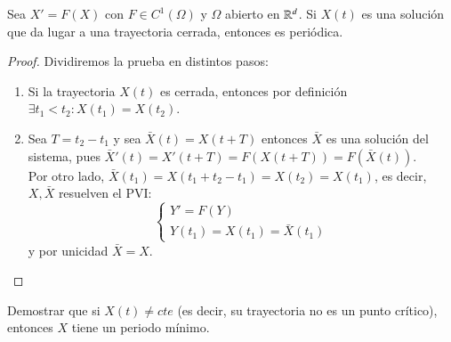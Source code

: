 \begin{pro}
Sea $X'=F(X)$ con $F\in C^1(\Omega)$ y $\Omega$ abierto en $\mathbb{R}^d$. Si $X(t)$ es una solución que da lugar a una trayectoria cerrada, entonces es periódica.
\end{pro}
\begin{proof}
    Dividiremos la prueba en distintos pasos:
    \begin{enumerate}
        \item Si la trayectoria $X(t)$ es cerrada, entonces por definición $\exists t_1 < t_2 : X(t_1) = X(t_2)$.
        \item Sea $T = t_2 - t_1$ y sea $\bar{X}(t) = X(t+T)$ entonces $\bar{X}$ es una solución del sistema, pues $\bar{X}'(t) = X'(t + T) = F(X(t + T)) = F(\bar{X}(t))$.\\
        Por otro lado, $\bar{X}(t_1) = X(t_1 + t_2 - t_1) = X(t_2) = X(t_1)$, es decir, $X, \bar{X}$ resuelven el PVI:
        $$
        \begin{cases}
            Y' = F(Y)\\
            Y(t_1) = X(t_1) = \bar{X}(t_1)
        \end{cases}
        $$
        y por unicidad $\bar{X} = X$.
    \end{enumerate}
\end{proof}
\begin{th_ex}
    Demostrar que si $X(t) \neq cte$ (es decir, su trayectoria no es un punto crítico), entonces $X$ tiene un periodo mínimo.
\end{th_ex}
